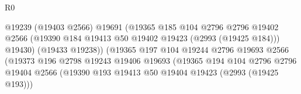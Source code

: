 \begin{lexlean}{R0}
\begin{coremodule}
                                                @19239
                                                (@19403 @2566)
                                                @19691
                                                (@19365
                                                  @185
                                                  @104
                                                  @2796
                                                  @2796
                                                  @19402
                                                  @2566
                                                  (@19390
                                                    @184
                                                    @19413
                                                    @50
                                                    @19402
                                                    @19423
                                                    (@2993 (@19425 @184)))
                                                  @19430)
                                                (@19433 @19238))
                                              (@19365
                                                @197
                                                @104
                                                @19244
                                                @2796
                                                @19693
                                                @2566
                                                (@19373
                                                  @196
                                                  @2798
                                                  @19243
                                                  @19406
                                                  @19693
                                                  (@19365
                                                    @194
                                                    @104
                                                    @2796
                                                    @2796
                                                    @19404
                                                    @2566
                                                    (@19390
                                                      @193
                                                      @19413
                                                      @50
                                                      @19404
                                                      @19423
                                                      (@2993 (@19425 @193)))

\end{coremodule}
\end{lexlean}
